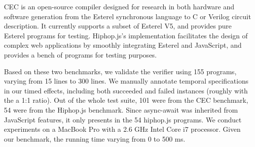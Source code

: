 \documentclass[acmsmall,10pt,review]{acmart}
\newcommand{\timedEffects}{\emph{TimEffs}}
\begin{document}
{CEC is an open-source compiler designed for research in both hardware and software generation from the Esterel synchronous language to C or Verilog circuit description. It currently supports a subset of Esterel V5, and provides pure Esterel programs for testing. Hiphop.js's implementation facilitates the design of complex web applications by smoothly integrating Esterel and JavaScript, and provides a bench of programs for testing purposes. 






   

Based on these two benchmarks, we validate the verifier using 155  programs, varying from 15 lines to 300 lines. We manually annotate temporal specifications in our timed effects, including both succeeded and failed instances (roughly with the a 1:1 ratio). 
Out of the whole test suite, 101 were from the CEC benchmark, 54 were from the Hiphop.js benchmark.  Since async-await was inherited from JavaScript features, it only presents in the 54 hiphop.js programs.
We conduct experiments on a MacBook Pro with a 2.6 GHz Intel Core i7 processor. Given our benchmark, the running time varying from 0 to 500 ms. 


}
\end{document}
